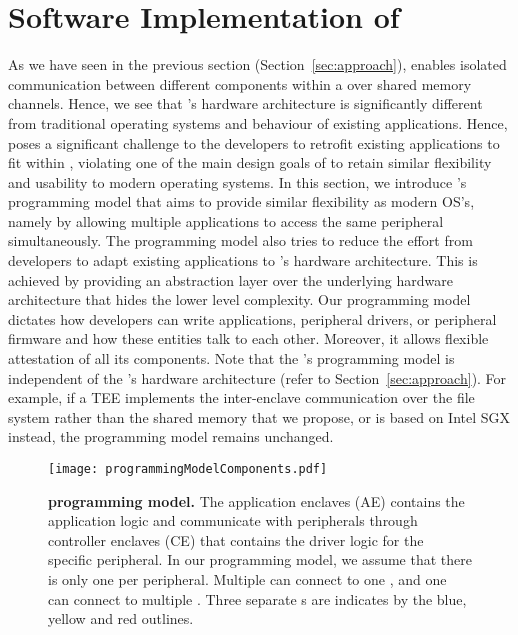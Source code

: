 \section{Software Implementation of \name}
\label{sec:programmingModel}


As we have seen in the previous section (Section~\ref{sec:approach}), \name enables isolated communication between different components within a \nameenclave over shared memory channels. Hence, we see that \name{}'s hardware architecture is significantly different from traditional operating systems and behaviour of existing applications. Hence, \name poses a significant challenge to the developers to retrofit existing applications to fit within \name{}, violating one of the main design goals of \name to retain similar flexibility and usability to modern operating systems. In this section, we introduce \name{}'s programming model that aims to provide similar flexibility as modern OS's, namely by allowing multiple applications to access the same peripheral simultaneously. The programming model also tries to reduce the effort from developers to adapt existing applications to \name{}'s hardware architecture. This is achieved by providing an abstraction layer over the underlying hardware architecture that hides the lower level complexity. Our programming model dictates how developers can write applications, peripheral drivers, or peripheral firmware and how these entities talk to each other. Moreover, it allows flexible attestation of all its components. Note that the \name{}'s programming model is independent of the \name{}'s hardware architecture (refer to Section~\ref{sec:approach}). For example, if a TEE implements the inter-enclave communication over the file system rather than the shared memory that we propose, or is based on Intel SGX instead, the programming model remains unchanged.

\begin{figure}[t]
\centering
\texttt{[image: programmingModelComponents.pdf]}
\caption{\textbf{\name programming model.} The application enclaves (AE) contains the application logic and communicate with peripherals through controller enclaves (CE) that contains the driver logic for the specific peripheral. In our programming model, we assume that there is only one \ce per peripheral. Multiple \app can connect to one \ce{}, and one \app can connect to multiple \ce. Three separate \nameenclave{}s are indicates by the blue, yellow and red outlines.}
\label{fig:programmingModelComponents}
\end{figure}

